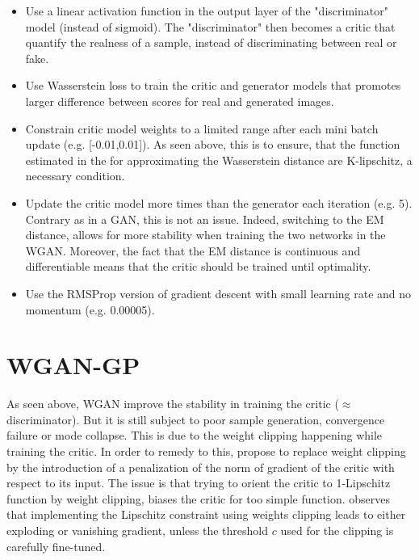 \documentclass[11pt,a4paper,twoside]{report}
\begin{document}
\begin{itemize}
    \item Use a linear activation function in the output layer of the "discriminator" model (instead of sigmoid). The "discriminator" then becomes a critic that quantify the realness of a sample, instead of discriminating between real or fake.
    \item Use Wasserstein loss to train the critic and generator models that promotes larger difference between scores for real and generated images. 
    \item Constrain critic model weights to a limited range after each mini batch update (e.g. [-0.01,0.01]). As seen above, this is to ensure, that the function estimated in the for approximating the Wasserstein distance are K-lipschitz, a necessary condition.
    \item Update the critic model more times than the generator each iteration (e.g. 5). Contrary as in a GAN, this is not an issue. Indeed, switching to the EM distance, allows for more stability when training the two networks in the WGAN. Moreover, the fact that the EM distance is continuous and differentiable means that the critic should be trained until optimality.
    \item Use the RMSProp version of gradient descent with small learning rate and no momentum (e.g. 0.00005).
    
\end{itemize}


\section{WGAN-GP}

As seen above, WGAN improve the stability in training the critic ($\approx$ discriminator). But it is still subject to poor sample generation, convergence failure or mode collapse. This is due to the weight clipping happening while training the critic. In order to remedy to this, \cite{DBLP:journals/corr/GulrajaniAADC17} propose to replace weight clipping by the introduction of a penalization of the norm of gradient of the critic with respect to its input. The issue is that trying to orient the critic to 1-Lipschitz function by weight clipping, biases the critic for too simple function. \cite{DBLP:journals/corr/GulrajaniAADC17} observes that implementing the Lipschitz constraint using weights clipping leads to either exploding or vanishing gradient, unless the threshold $c$ used for the clipping is carefully fine-tuned.
\end{document}
